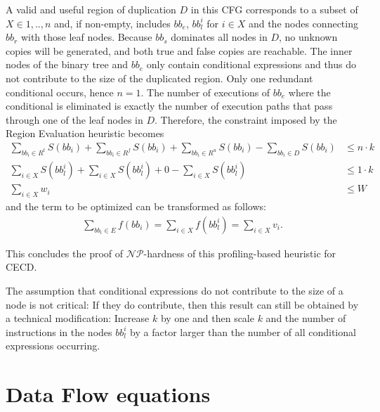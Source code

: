 \documentclass[halfparskip]{scrartcl}
\begin{document}
A valid and useful region of duplication $D$ in this CFG corresponds to a subset of $X \in {1,..,n}$ and, if non-empty, includes $bb_e$, $bb_l^i$ for $i\in X$ and the nodes connecting $bb_r$ with those leaf nodes. Because $bb_s$ dominates all nodes in $D$, no unknown copies will be generated, and both true and false copies are reachable. The inner nodes of the binary tree and $bb_e$ only contain conditional expressions and thus do not contribute to the size of the duplicated region. Only one redundant conditional occurs, hence $n=1$. The number of executions of $bb_e$ where the conditional is eliminated is exactly the number of execution paths that pass through one of the leaf nodes in $D$. Therefore, the constraint imposed by the Region Evaluation heuristic becomes
\begin{align*}
\sum_{bb_i\in R^t} S(bb_i) + 
\sum_{bb_i\in R^f} S(bb_i) + 
\sum_{bb_i\in R^u} S(bb_i) - 
\sum_{bb_i\in D} S(bb_i) &\le n \cdot k \tag*{$\iff$} \\
\sum_{i\in X} S(bb_l^i) + \sum_{i\in X} S(bb_l^i) + 0 - \sum_{i \in X} S(bb_l^i) &\le 1 \cdot k  \tag*{$\iff$} \\
\sum_{i\in X} w_i &\le W
\end{align*}
and the term to be optimized can be transformed as follows:
\begin{align*}
\sum_{bb_i\in E} f(bb_i) 
= \sum_{i\in X} f(bb_l^i) 
= \sum_{i\in X} v_i.
\end{align*}

This concludes the proof of $\mathcal{NP}$-hardness of this profiling-based heuristic for CECD.

The assumption that conditional expressions do not contribute to the size of a node is not critical: If they do contribute, then this result can still be obtained by a technical modification: Increase $k$ by one and then scale $k$ and the number of instructions in the nodes $bb_l^i$ by a factor larger than the number of all conditional expressions occurring.


\section{Data Flow equations}
\label{sec:df}

\newcommand{\V}{\text{Valid}}
\newcommand{\T}{\text{TrueEdge}}
\newcommand{\F}{\text{FalseEdge}}
\newcommand{\E}{\text{Expr}}
\renewcommand{\L}{\text{Live}}
\newcommand{\A}{\text{Antic}}
\renewcommand{\succ}[1]{\operatorname{succ}(#1)}
\newcommand{\pred}[1]{\operatorname{pred}(#1)}
\end{document}
